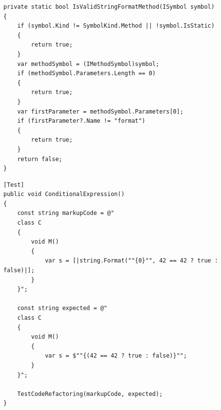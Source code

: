 \begin{lstlisting}[caption={Mehtode \textit{IsValidStringFormatMethod}},
label=lst:code-IsValidStringFormatMethod]
private static bool IsValidStringFormatMethod(ISymbol symbol)
{
	if (symbol.Kind != SymbolKind.Method || !symbol.IsStatic)
	{
		return true;
	}
	var methodSymbol = (IMethodSymbol)symbol;
	if (methodSymbol.Parameters.Length == 0)
	{
		return true;
	}
	var firstParameter = methodSymbol.Parameters[0];
	if (firstParameter?.Name != "format")
	{
		return true;
	}
	return false;
}
\end{lstlisting}

\begin{lstlisting}[caption={Mehtode \textit{ConditionalExpression}},
label=lst:code-ConditionalExpression]
[Test]
public void ConditionalExpression()
{
	const string markupCode = @"
	class C
	{
		void M()
		{
			var s = [|string.Format(""{0}"", 42 == 42 ? true : false)|];
		}
	}";
	
	const string expected = @"
	class C
	{
		void M()
		{
			var s = $""{(42 == 42 ? true : false)}"";
		}
	}";

	TestCodeRefactoring(markupCode, expected);
}
\end{lstlisting}
